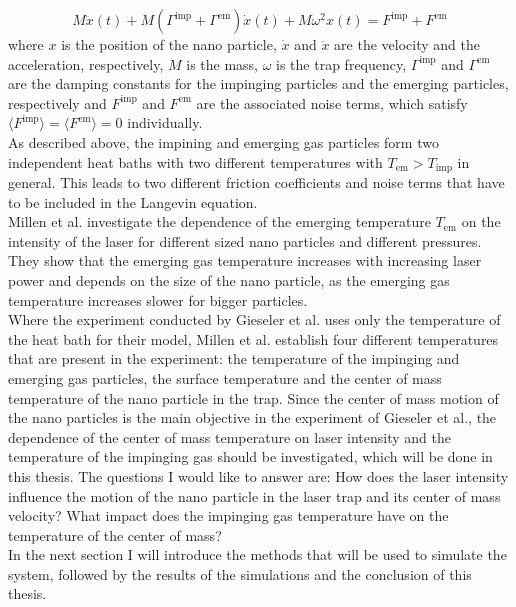 \documentclass[12pt]{article}
\begin{document}
\begin{equation}
    M\ddot{x}(t) + M\left(\Gamma^\text{imp}+\Gamma^\text{em}\right)\dot{x}(t) + M\omega^2x(t) =F^\text{imp}+F^\text{em}
\end{equation}
where $x$ is the position of the nano particle, $\dot{x}$ and $\ddot{x}$ are the velocity and the acceleration, respectively, $M$ is the mass,
$\omega$ is the trap frequency, $\Gamma^\text{imp}$ and $\Gamma^\text{em}$ are the damping constants for the 
impinging particles and the emerging particles, respectively and $F^\text{imp}$ and $F^\text{em}$ are the associated noise terms, 
which satisfy $\langle F^\text{imp}\rangle= \langle F^\text{em} \rangle = 0$ individually.\\
As described above, the impining and emerging gas particles form two independent heat baths with two different temperatures 
with $T_\text{em} > T_\text{imp}$ in general. This leads to two different friction coefficients and noise terms that have to be included in the 
Langevin equation.\\
Millen et al. investigate the dependence of the emerging temperature $T_\text{em}$ on the intensity of the laser for different sized nano particles
and different pressures. They show that the emerging gas temperature increases with increasing laser power and depends on the size of the nano
particle, as the emerging gas temperature increases slower for bigger particles.\\
Where the experiment conducted by Gieseler et al. uses only the temperature of the heat bath for their model, Millen et al. establish four different
temperatures that are present in the experiment: the temperature of the impinging and emerging gas particles, the
surface temperature and the center of mass temperature of the nano particle in the trap. Since the center of mass motion of the nano particles
is the main objective in the experiment of Gieseler et al., the dependence of the center of mass temperature on 
laser intensity and the temperature of the impinging gas should be investigated, which will be done in this thesis. The questions I would like to
answer are: How does the laser intensity influence the motion of the nano particle in the laser trap and its center of mass velocity? What impact
does the impinging gas temperature have on the temperature of the center of mass?\\
In the next section I will introduce the methods that will be used to simulate the system, followed by the results of the simulations and the
conclusion of this thesis.
\end{document}
